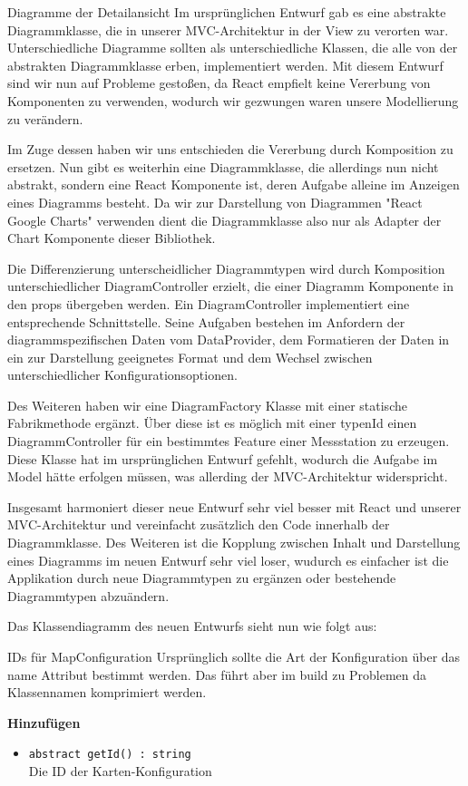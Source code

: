 \begin{Change}{Diagramme der Detailansicht}
    Im ursprünglichen Entwurf gab es eine abstrakte Diagrammklasse, die in unserer MVC-Architektur in der View zu verorten war. Unterschiedliche Diagramme sollten als unterschiedliche Klassen, die alle von der abstrakten Diagrammklasse erben, implementiert werden.
    Mit diesem Entwurf sind wir nun auf Probleme gestoßen, da React empfielt keine Vererbung von Komponenten zu verwenden, wodurch wir gezwungen waren unsere Modellierung zu verändern.

    Im Zuge dessen haben wir uns entschieden die Vererbung durch Komposition zu ersetzen. Nun gibt es weiterhin eine Diagrammklasse, die allerdings nun nicht abstrakt, sondern eine React Komponente ist, deren Aufgabe alleine im Anzeigen eines Diagramms besteht. Da wir zur Darstellung von Diagrammen "React Google Charts" verwenden dient die Diagrammklasse also nur als Adapter der Chart Komponente dieser Bibliothek.

    Die Differenzierung unterscheidlicher Diagrammtypen wird durch Komposition unterschiedlicher DiagramController erzielt, die einer Diagramm Komponente in den props übergeben werden. Ein DiagramController implementiert eine entsprechende Schnittstelle. Seine Aufgaben bestehen im Anfordern der diagrammspezifischen Daten vom DataProvider, dem Formatieren der Daten in ein zur Darstellung geeignetes Format und dem Wechsel zwischen unterschiedlicher Konfigurationsoptionen.

    Des Weiteren haben wir eine DiagramFactory Klasse mit einer statische Fabrikmethode ergänzt. Über diese ist es möglich mit einer typenId einen DiagrammController für ein bestimmtes Feature einer Messstation zu erzeugen. Diese Klasse hat im ursprünglichen Entwurf gefehlt, wodurch die Aufgabe im Model hätte erfolgen müssen, was allerding der MVC-Architektur widerspricht.

    Insgesamt harmoniert dieser neue Entwurf sehr viel besser mit React und unserer MVC-Architektur und vereinfacht zusätzlich den Code innerhalb der Diagrammklasse. Des Weiteren ist die Kopplung zwischen Inhalt und Darstellung eines Diagramms im neuen Entwurf sehr viel loser, wudurch es einfacher ist die Applikation durch neue Diagrammtypen zu ergänzen oder bestehende Diagrammtypen abzuändern.
    
    Das Klassendiagramm des neuen Entwurfs sieht nun wie folgt aus:
\end{Change}

\begin{Change}{IDs für MapConfiguration}
    Ursprünglich sollte die Art der Konfiguration über das name Attribut bestimmt werden.
    Das führt aber im build zu Problemen da Klassennamen komprimiert werden.

    \textbf{Hinzufügen}
    \begin{itemize}
        \item \texttt{abstract getId() : string}
        \\ Die ID der Karten-Konfiguration
    \end{itemize}
\end{Change}


